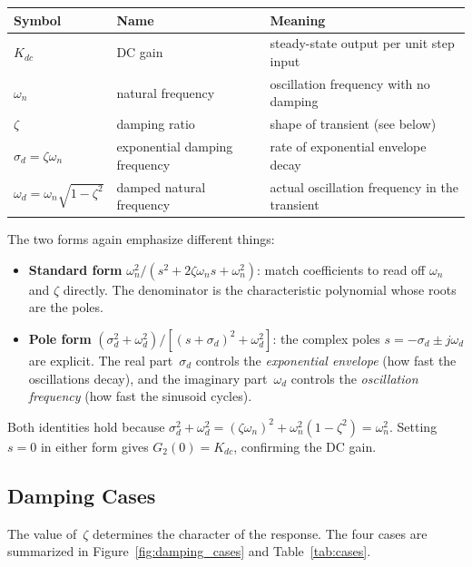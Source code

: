 \documentclass[../../book.tex]{subfiles}
\begin{document}
\begin{center}
\begin{tabular}{lll}
  \toprule
  Symbol & Name & Meaning \\
  \midrule
  $K_{dc}$ & DC gain & steady-state output per unit step input \\
  $\omega_n$ & natural frequency & oscillation frequency with no damping \\
  $\zeta$ & damping ratio & shape of transient (see below) \\
  $\sigma_d = \zeta\omega_n$ & exponential damping frequency &
    rate of exponential envelope decay \\
  $\omega_d = \omega_n\sqrt{1-\zeta^2}$ & damped natural frequency &
    actual oscillation frequency in the transient \\
  \bottomrule
\end{tabular}
\end{center}

The two forms again emphasize different things:

\begin{itemize}
  \item \textbf{Standard form} $\omega_n^2/(s^2 + 2\zeta\omega_n s + \omega_n^2)$:
    match coefficients to read off $\omega_n$ and $\zeta$ directly.
    The denominator is the characteristic polynomial whose roots are the poles.
  \item \textbf{Pole form} $(\sigma_d^2+\omega_d^2)/[(s+\sigma_d)^2+\omega_d^2]$:
    the complex poles $s = -\sigma_d \pm j\omega_d$ are explicit.  The real
    part~$\sigma_d$ controls the \emph{exponential envelope} (how fast the
    oscillations decay), and the imaginary part~$\omega_d$ controls the
    \emph{oscillation frequency} (how fast the sinusoid cycles).
\end{itemize}

Both identities hold because $\sigma_d^2 + \omega_d^2 = (\zeta\omega_n)^2 +
\omega_n^2(1-\zeta^2) = \omega_n^2$.  Setting $s=0$ in either form gives
$G_2(0) = K_{dc}$, confirming the DC gain.

\subsection{Damping Cases}
\label{sec:second_cases}

The value of~$\zeta$ determines the character of the response.  The four cases
are summarized in Figure~\ref{fig:damping_cases} and Table~\ref{tab:cases}.
\end{document}
